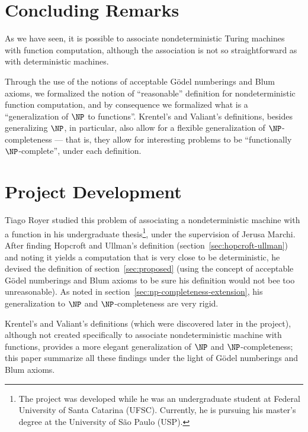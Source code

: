 \documentclass[12pt]{article}
\theoremstyle{definition}
\begin{document}
\section{Concluding Remarks}
\label{sec:conclusion}

As we have seen,
it is possible to associate nondeterministic Turing machines
with function computation,
although the association is not so straightforward as with deterministic machines.

Through the use of the notions of acceptable Gödel numberings
and Blum axioms,
we formalized the notion of ``reasonable'' definition
for nondeterministic function computation,
and by consequence we formalized what is a ``generalization of $\NP$ to functions''.
Krentel's and Valiant's definitions,
besides generalizing $\NP$, in particular,
also allow for a flexible generalization of $\NP$-completeness
--- that is, they allow for interesting problems to be ``functionally $\NP$-complete'',
under each definition.

\section{Project Development}
\label{sec:development}

Tiago Royer studied this problem of associating a nondeterministic machine
with a function in his undergraduate thesis\footnote{
    The project was developed while he was an undergraduate student
    at Federal University of Santa Catarina (UFSC).
    Currently, he is pursuing his master's degree
    at the University of São Paulo (USP).
},
under the supervision of Jerusa Marchi.
After finding Hopcroft and Ullman's definition
(section~\ref{sec:hopcroft-ullman})
and noting it yields a computation that is very close to be deterministic,
he devised the definition of section~\ref{sec:proposed}
(using the concept of acceptable Gödel numberings and Blum axioms
to be sure his definition would not bee too unreasonable).
As noted in section~\ref{sec:np-completeness-extension},
his generalization to $\NP$ and $\NP$-completeness are very rigid.

Krentel's and Valiant's definitions
(which were discovered later in the project),
although not created specifically to associate nondeterministic machine with functions,
provides a more elegant generalization of $\NP$ and $\NP$-completeness;
this paper summarize all these findings
under the light of Gödel numberings and Blum axioms.



\end{document}
